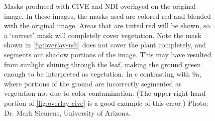 \documentclass[letterpaper]{report}
\begin{document}
{\begin{figure}[H]
	\centering
	\hfill
	\caption[Masks overlayed on original images]{Masks produced with CIVE and NDI overlayed on the original image. In these images, the masks used are colored red and blended with the original image. Areas that are tinted red will be shown, so a `correct' mask will completely cover vegetation. Note the mask shown in \ref{fig:overlay-ndi} does not cover the plant completely, and segments out shadow portions of the image. This may have resulted from sunlight shining through the leaf, making the ground green enough to be interpreted as vegetation. In c contrasting with 9a, where portions of the ground are incorrectly segmented as vegetation not due to color contamination. (The upper right-hand portion of \ref{fig:overlay-cive} is a good example of this error.) Photo: Dr. Mark Siemens, University of Arizona.}
	\label{fig:overlay}
\end{figure}

}
\end{document}
